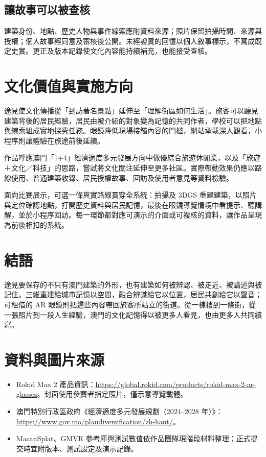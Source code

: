 \documentclass[UTF8,a4paper,11pt]{ctexart}
\begin{document}
\subsection{讓故事可以被查核}
建築身份、地點、歷史人物與事件線索應附資料來源；照片保留拍攝時間、來源與授權；個人故事經同意及審核後公開。未經證實的回憶以個人敘事標示，不寫成既定史實。更正及版本記錄使文化內容能持續補充，也能接受查核。

\section{文化價值與實施方向}
途見使文化傳播從「到訪著名景點」延伸至「理解街區如何生活」。旅客可以聽見建築背後的居民經驗，居民由被介紹的對象變為記憶的共同作者，學校可以把地點與線索組成實地探究任務。眼鏡降低現場接觸內容的門檻，網站承載深入觀看，小程序則讓體驗在旅途前後延續。

作品呼應澳門「1+4」經濟適度多元發展方向中做優綜合旅遊休閒業，以及「旅遊＋文化／科技」的思路，嘗試將文化關注延伸至更多社區。實際帶動效果仍應以路線使用、普通建築收錄、居民授權故事、回訪及使用者意見等資料檢驗。

面向比賽展示，可選一條真實路線貫穿全系統：拍攝及 3DGS 重建建築，以照片與定位確認地點，打開歷史資料與居民記憶，最後在眼鏡導覽情境中看提示、聽講解，並於小程序回訪。每一環節都對應可演示的介面或可複核的資料，讓作品呈現為前後相扣的系統。

\section{結語}
途見要保存的不只有澳門建築的外形，也有建築如何被辨認、被走近、被講述與被記住。三維重建給城市記憶以空間，融合辨識給它以位置，居民共創給它以聲音；可租借的 AR 眼鏡則把這些內容帶回旅客所站立的街道。從一棟樓到一條街，從一張照片到一段人生經驗，澳門的文化記憶得以被更多人看見，也由更多人共同續寫。

\section*{資料與圖片來源}
\begin{itemize}[leftmargin=2em]
\item Rokid Max 2 產品資訊：\url{https://global.rokid.com/products/rokid-max-2-ar-glasses}。封面使用參賽者指定照片，僅示意導覽載體。
\item 澳門特別行政區政府《經濟適度多元發展規劃（2024--2028 年）》：\url{https://www.gov.mo/plandiversification/zh-hant/}。
\item MacauSplat、GMVR 參考庫與測試數值依作品團隊現階段材料整理；正式提交時宜附版本、測試設定及演示記錄。
\end{itemize}
\end{document}
